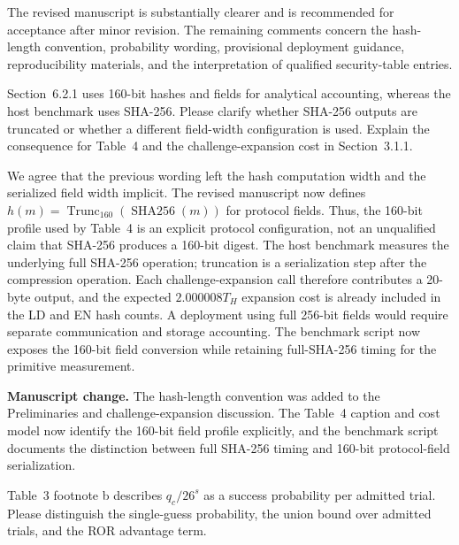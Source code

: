 \reviewer

\begin{generalcomment}
The revised manuscript is substantially clearer and is recommended for acceptance after minor revision. The remaining comments concern the hash-length convention, probability wording, provisional deployment guidance, reproducibility materials, and the interpretation of qualified security-table entries.
\end{generalcomment}

\begin{revcomment}
Section~6.2.1 uses 160-bit hashes and fields for analytical accounting, whereas the host benchmark uses SHA-256. Please clarify whether SHA-256 outputs are truncated or whether a different field-width configuration is used. Explain the consequence for Table~4 and the challenge-expansion cost in Section~3.1.1.
\end{revcomment}

\begin{revresponse}
We agree that the previous wording left the hash computation width and the serialized field width implicit. The revised manuscript now defines $h(m)=\operatorname{Trunc}_{160}(\operatorname{SHA256}(m))$ for protocol fields. Thus, the 160-bit profile used by Table~4 is an explicit protocol configuration, not an unqualified claim that SHA-256 produces a 160-bit digest. The host benchmark measures the underlying full SHA-256 operation; truncation is a serialization step after the compression operation. Each challenge-expansion call therefore contributes a 20-byte output, and the expected $2.000008T_H$ expansion cost is already included in the LD and EN hash counts. A deployment using full 256-bit fields would require separate communication and storage accounting. The benchmark script now exposes the 160-bit field conversion while retaining full-SHA-256 timing for the primitive measurement.
\end{revresponse}
\begin{changes}
\textbf{Manuscript change.} The hash-length convention was added to the Preliminaries and challenge-expansion discussion. The Table~4 caption and cost model now identify the 160-bit field profile explicitly, and the benchmark script documents the distinction between full SHA-256 timing and 160-bit protocol-field serialization.
\end{changes}

\begin{revcomment}
Table~3 footnote b describes $q_c/26^s$ as a success probability per admitted trial. Please distinguish the single-guess probability, the union bound over admitted trials, and the ROR advantage term.
\end{revcomment}

